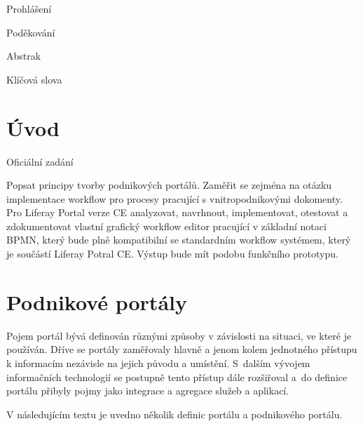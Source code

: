 \documentclass{fithesis}
\begin{document}
\FrontMatter
\ThesisTitlePage

\begin{ThesisDeclaration}
Prohlášení\AdvisorName
\end{ThesisDeclaration}

\begin{ThesisThanks}
Poděkování
\end{ThesisThanks}

\begin{ThesisAbstract}
Abstrak
\end{ThesisAbstract}

\begin{ThesisKeyWords}
Klíčová slova
\end{ThesisKeyWords}


\MainMatter
\setcounter{secnumdepth}{4}
\tableofcontents

\chapter{Úvod}
Oficiální zadání

Popsat principy tvorby podnikových portálů. Zaměřit se zejména na otázku implementace workflow pro procesy pracující s vnitropodnikovými dokomenty. Pro Liferay Portal verze CE analyzovat, navrhnout, implementovat, otestovat a zdokumentovat vlastní grafický workflow editor pracující v základní notaci BPMN, který bude plně kompatibilní se standardním workflow systémem, který je součástí Liferay Potral CE. Výstup bude mít podobu funkčního prototypu.

\chapter{Podnikové portály}

Pojem portál bývá definován různými způsoby v závislosti na situaci, ve které je používán. Dříve se portály zaměřovaly hlavně a jenom kolem jednotného přístupu k informacím nezávisle na jejich původu a umístění. S~dalším vývojem informačních technologií se postupně tento přístup dále rozšiřoval a~do definice portálu přibyly pojmy jako integrace a agregace služeb a aplikací. 

V následujícím textu je uvedno několik definic portálu a podnikového portálu.
\end{document}
